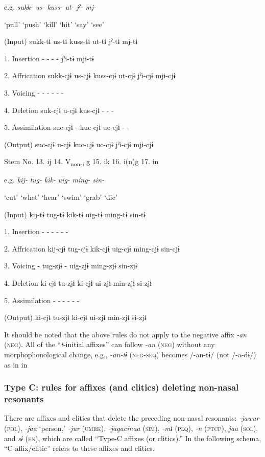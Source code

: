 \begin{table}
  e.g.  \textit{sukk-}  \textit{us-}  \textit{kuss-}  \textit{ut-}  \textit{jˀ-}  \textit{mj-}

    ‘pull’  ‘push’  ‘kill’  ‘hit’  ‘say’  ‘see’

  (Input)  sukk-tɨ  us-tɨ  kuss-tɨ  ut-tɨ  jˀ-tɨ  mj-tɨ

1.  Insertion  {}-  {}-  {}-  {}-  jˀi-tɨ  mji-tɨ

2.  Affrication  sukk-cjɨ  us-cjɨ  kuss-cjɨ  ut-cjɨ  jˀi-cjɨ  mji-cjɨ

3.  Voicing  {}-  {}-  {}-  {}-  {}-  {}-

4.  Deletion  suk-cjɨ  u-cjɨ  kus-cjɨ  {}-  {}-  {}-

5.  Assimilation  suc-cjɨ  {}-  kuc-cjɨ  uc-cjɨ  {}-  {}-

  (Output)  suc-cjɨ  u-cjɨ  kuc-cjɨ  uc-cjɨ  jˀi-cjɨ  mji-cjɨ

  Stem No.  13. ij  14. V\textsubscript{non-}\textit{\textsubscript{i}} g  15. ik  16. i(n)g    17. in

  e.g.  \textit{kij-}  \textit{tug-}  \textit{kik-}  \textit{uig-}  \textit{ming-}  \textit{sin-}

    ‘cut’  ‘whet’  ‘hear’  ‘swim’  ‘grab’  ‘die’

  (Input)  kij-tɨ  tug-tɨ  kik-tɨ  uig-tɨ  ming-tɨ  sin-tɨ

1.  Insertion  {}-  {}-  {}-  {}-  {}-  {}-

2.  Affrication  kij-cjɨ  tug-cjɨ  kik-cjɨ  uig-cjɨ  ming-cjɨ  sin-cjɨ

3.  Voicing  {}-  tug-zjɨ  {}-  uig-zjɨ  ming-zjɨ  sin-zjɨ

4.  Deletion  ki-cjɨ  tu-zjɨ  ki-cjɨ  ui-zjɨ  min-zjɨ  si-zjɨ

5.  Assimilation  {}-  {}-  {}-  {}-  {}-  {}-

  (Output)  ki-cjɨ  tu-zjɨ  ki-cjɨ  ui-zjɨ  min-zjɨ  si-zjɨ
\end{table}

It should be noted that the above rules do not apply to the negative affix \textit{{}-an} (\textsc{neg}). All of the “\textit{t}{}-initial affixes” can follow \textit{{}-an} (\textsc{neg}) without any morphophonological change, e.g., \textit{{}-an-tɨ} (\textsc{neg}-\textsc{seq}) becomes /-an-tɨ/ (not /-a-dɨ/) as in  in 

\subsubsection{Type C: rules for affixes (and clitics) deleting non-nasal resonants}
\label{bkm:Ref347177215}
There are affixes and clitics that delete the preceding non-nasal resonants: \textit{{}-jawur} (\textsc{pol}), \textit{{}-jaa} ‘person,’ \textit{{}-jur} (\textsc{umrk}), \textit{{}-jagacinaa} (\textsc{sim}), \textit{{}-mɨ} (\textsc{plq}), \textit{{}-n} (\textsc{ptcp}), \textit{jaa} (\textsc{sol}), and \textit{sɨ} (\textsc{fn}), which are called “Type-C affixes (or clitics).” In the following schema, “C-affix/clitic” refers to these affixes and clitics.

